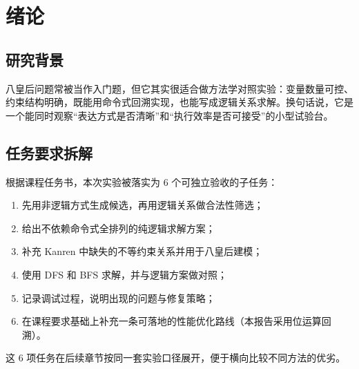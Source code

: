 ﻿\chapter{绪论}\label{chap:guide}

\section{研究背景}

八皇后问题常被当作入门题，但它其实很适合做方法学对照实验：变量数量可控、约束结构明确，既能用命令式回溯实现，也能写成逻辑关系求解。换句话说，它是一个能同时观察“表达方式是否清晰”和“执行效率是否可接受”的小型试验台\cite{russell2021ai,byrd2006minikanren,mackworth1977consistency}。

\section{任务要求拆解}

根据课程任务书，本次实验被落实为 6 个可独立验收的子任务：

\begin{enumerate}
  \item 先用非逻辑方式生成候选，再用逻辑关系做合法性筛选；
  \item 给出不依赖命令式全排列的纯逻辑求解方案；
  \item 补充 Kanren 中缺失的不等约束关系并用于八皇后建模；
  \item 使用 DFS 和 BFS 求解，并与逻辑方案做对照；
  \item 记录调试过程，说明出现的问题与修复策略；
  \item 在课程要求基础上补充一条可落地的性能优化路线（本报告采用位运算回溯）。
\end{enumerate}

这 6 项任务在后续章节按同一套实验口径展开，便于横向比较不同方法的优劣。
